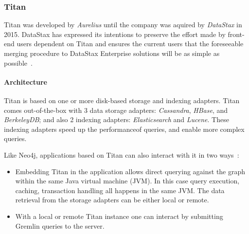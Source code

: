 \subsubsection{Titan}
\label{sect:titan}

Titan was developed by \emph{Aurelius} until the company was aquired by \emph{DataStax} in 2015. DataStax has expressed its intentions to preserve the effort made by front-end users dependent on Titan and ensures the current users that the foreseeable merging procedure to DataStax Enterprise solutions will be as simple as possible~\cite{titan-datastax-acquirement}.

\paragraph{Architecture}

Titan is based on one or more disk-based storage and indexing adapters. Titan comes out-of-the-box with 3 data storage adapters: \emph{Cassandra}, \emph{HBase}, and \emph{BerkeleyDB}; and also 2 indexing adapters: \emph{Elasticsearch} and \emph{Lucene}. These indexing adapters speed up the performanceof queries, and enable more complex queries.

Like Neo4j, applications based on Titan can also interact with it in two ways~\cite{titan-arch}:
\begin{itemize}[topsep=0pt]
  \item Embedding Titan in the application allows direct querying against the graph within the same Java virtual machine (JVM). In this case query execution, caching, transaction handling all happens in the same JVM. The data retrieval from the storage adapters can be either local or remote.
  \item With a local or remote Titan instance one can interact by submitting Gremlin queries to the server.
\end{itemize}


